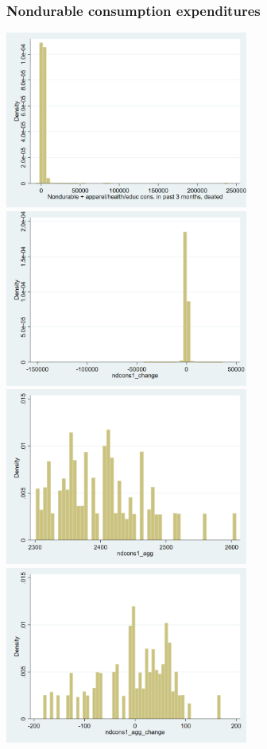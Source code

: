 \documentclass[12pt,a4paper]{article}
\begin{document}
\subsubsection*{Nondurable consumption expenditures}
\begin{center}
\includegraphics[width=8cm]{ndcons1.png}
\includegraphics[width=8cm]{ndcons1_change.png}\\
\includegraphics[width=8cm]{ndcons1_agg.png}
\includegraphics[width=8cm]{ndcons1_agg_change.png}\\

\end{center}
\end{document}
